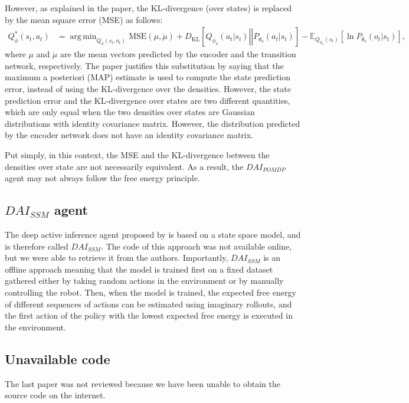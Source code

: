 \documentclass[twoside,11pt]{article}
\newcommand{\kl}[2]{D_{\mathrm{KL}} \left[ \left. \left. #1 \right|\right| #2 \right] }
\DeclareMathOperator*{\argmin}{arg\,min}
\begin{document}
However, as explained in the paper, the KL-divergence (over states) is replaced by the mean square error (MSE) as follows:
\begin{align*}
Q^*_{\phi}(s_t, a_t) &= \argmin_{Q_{\phi}(s_t, a_t)} \text{MSE}(\mu, \mathring{\mu}) + \kl{Q_{\phi_a}(a_t|s_t)}{P_{\theta_a}(a_t|s_t)} - \mathbb{E}_{Q_{\phi_s}(s_t)}[\ln P_{\theta_o}(o_t|s_t)],
\end{align*}
where $\mu$ and $\mathring{\mu}$ are the mean vectors predicted by the encoder and the transition network, respectively. The paper justifies this substitution by saying that the maximum a posteriori (MAP) estimate is used to compute the state prediction error, instead of using the KL-divergence over the densities. However, the state prediction error and the KL-divergence over states are two different quantities, which are only equal when the two densities over states are Gaussian distributions with identity covariance matrix. However, the distribution predicted by the encoder network does not have an identity covariance matrix.

Put simply, in this context, the MSE and the KL-divergence between the densities over state are not necessarily equivalent. As a result, the $DAI_{POMDP}$ agent may not always follow the free energy principle.

\subsection{$DAI_{SSM}$ agent \citep{DAI_POMDP}}

The deep active inference agent proposed by \citep{ccatal2020learning} is based on a state space model, and is therefore called $DAI_{SSM}$. The code of this approach was not available online, but we were able to retrieve it from the authors. Importantly, $DAI_{SSM}$ is an offline approach meaning that the model is trained first on a fixed dataset gathered either by taking random actions in the environment or by manually controlling the robot. Then, when the model is trained, the expected free energy of different sequences of actions can be estimated using imaginary rollouts, and the first action of the policy with the lowest expected free energy is executed in the environment.

\subsection{Unavailable code}

The last paper \citep{schneider2022active} was not reviewed because we have been unable to obtain the source code on the internet. 
\end{document}
